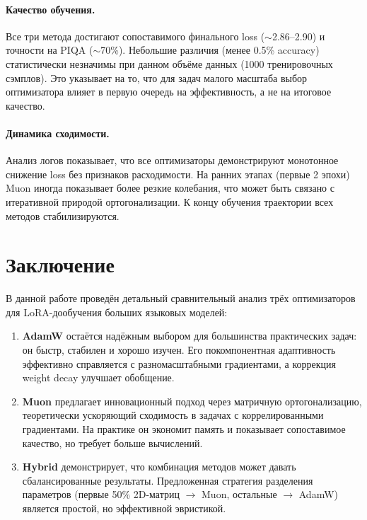 \documentclass[a4paper,12pt]{article}
\begin{document}
\paragraph{Качество обучения.}
Все три метода достигают сопоставимого финального loss ($\sim$2.86--2.90) и точности на PIQA ($\sim$70\%). Небольшие различия (менее 0.5\% accuracy) статистически незначимы при данном объёме данных (1000 тренировочных сэмплов). Это указывает на то, что для задач малого масштаба выбор оптимизатора влияет в первую очередь на эффективность, а не на итоговое качество.

\paragraph{Динамика сходимости.}
Анализ логов показывает, что все оптимизаторы демонстрируют монотонное снижение loss без признаков расходимости. На ранних этапах (первые 2 эпохи) Muon иногда показывает более резкие колебания, что может быть связано с итеративной природой ортогонализации. К концу обучения траектории всех методов стабилизируются.
\newpage

\section{Заключение}
\label{sec:conclusion}

В данной работе проведён детальный сравнительный анализ трёх оптимизаторов для LoRA-дообучения больших языковых моделей:

\begin{enumerate}
    \item \textbf{AdamW} остаётся надёжным выбором для большинства практических задач: он быстр, стабилен и хорошо изучен. Его покомпонентная адаптивность эффективно справляется с разномасштабными градиентами, а коррекция weight decay улучшает обобщение.
    
    \item \textbf{Muon} предлагает инновационный подход через матричную ортогонализацию, теоретически ускоряющий сходимость в задачах с коррелированными градиентами. На практике он экономит память и показывает сопоставимое качество, но требует больше вычислений.
    
    \item \textbf{Hybrid} демонстрирует, что комбинация методов может давать сбалансированные результаты. Предложенная стратегия разделения параметров (первые 50\% 2D-матриц $\rightarrow$ Muon, остальные $\rightarrow$ AdamW) является простой, но эффективной эвристикой.
\end{enumerate}
\end{document}
